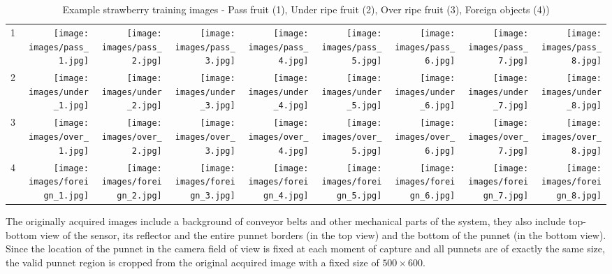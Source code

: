 \documentclass[fleqn,twoside,12pt]{report}
\begin{document}
\begin{table}[t]
	\centering
	\caption{Example strawberry training images - Pass fruit (1), Under ripe fruit (2), Over ripe fruit (3), Foreign objects (4))}
	\label{tab:training_samples}
	\begin{tabular}{c*8{N}}
		
		1 &
		\texttt{[image: images/pass\_1.jpg]} & \texttt{[image: images/pass\_2.jpg]} & \texttt{[image: images/pass\_3.jpg]} &         \texttt{[image: images/pass\_4.jpg]} & \texttt{[image: images/pass\_5.jpg]} &         \texttt{[image: images/pass\_6.jpg]} & \texttt{[image: images/pass\_7.jpg]} &         \texttt{[image: images/pass\_8.jpg]} \\
		
		2 &
		\texttt{[image: images/under\_1.jpg]} & \texttt{[image: images/under\_2.jpg]} & \texttt{[image: images/under\_3.jpg]} &         \texttt{[image: images/under\_4.jpg]} & \texttt{[image: images/under\_5.jpg]} &         \texttt{[image: images/under\_6.jpg]} & \texttt{[image: images/under\_7.jpg]} &         \texttt{[image: images/under\_8.jpg]} \\
		
		3 &
		\texttt{[image: images/over\_1.jpg]} & \texttt{[image: images/over\_2.jpg]} & \texttt{[image: images/over\_3.jpg]} &         \texttt{[image: images/over\_4.jpg]} & \texttt{[image: images/over\_5.jpg]} &         \texttt{[image: images/over\_6.jpg]} & \texttt{[image: images/over\_7.jpg]} &         \texttt{[image: images/over\_8.jpg]} \\
		
		4 &
		\texttt{[image: images/foreign\_1.jpg]} & \texttt{[image: images/foreign\_2.jpg]} & \texttt{[image: images/foreign\_3.jpg]} &         \texttt{[image: images/foreign\_4.jpg]} & \texttt{[image: images/foreign\_5.jpg]} &         \texttt{[image: images/foreign\_6.jpg]} & \texttt{[image: images/foreign\_7.jpg]} &         \texttt{[image: images/foreign\_8.jpg]} \\
		
	\end{tabular}
\end{table} 



The originally acquired images include a background of conveyor belts and other mechanical parts of the system, they also include top-bottom view of the sensor, its reflector and the entire punnet borders (in the top view) and the bottom of the punnet (in the bottom view). Since the location of the punnet in the camera field of view is fixed at each moment of capture and all punnets are of exactly the same size, the valid punnet region is cropped from the original acquired image with a fixed size of $500 \times 600$. 
\end{document}
